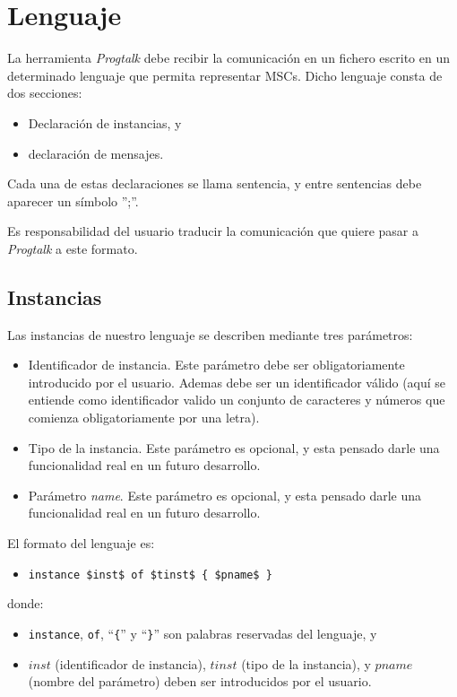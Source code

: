 \documentclass[12pt,a4paper]{report}
\newcommand{\lstsetpt}{
  \lstset{
    language=progtalk,
    style=spec,
  }
}
\begin{document}
\chapter{Lenguaje}
\label{ch:lenguaje}
\lstsetpt

La herramienta \textit{Progtalk} debe recibir la comunicación en un fichero escrito en un determinado lenguaje que permita representar MSCs. Dicho lenguaje consta de dos secciones:
\begin{itemize}
\item Declaración de instancias, y
\item declaración de mensajes.
\end{itemize}

Cada una de estas declaraciones se llama sentencia, y entre sentencias debe aparecer un símbolo '';''.

Es responsabilidad del usuario traducir la comunicación que quiere pasar a \textit{Progtalk} a este formato.

\section{Instancias}

Las instancias de nuestro lenguaje se describen mediante tres parámetros:

\begin{itemize}
\item Identificador de instancia. Este parámetro debe ser obligatoriamente introducido por el usuario. Ademas debe ser un identificador válido (aquí se entiende como identificador valido un conjunto de caracteres y números que comienza obligatoriamente por una letra).
\item Tipo de la instancia. Este parámetro es opcional, y esta pensado darle una funcionalidad real en un futuro desarrollo.
\item Parámetro \textit{name}. Este parámetro es opcional, y esta pensado darle una funcionalidad real en un futuro desarrollo.
\end{itemize}

El formato del lenguaje es:

\begin{itemize}
\item \lstinline[mathescape]!instance $inst$ of $tinst$ { $pname$ }!
\end{itemize}
donde:
\begin{itemize}
\item \lstinline{instance}, \lstinline{of}, ``\lstinline!{!'' y ``\lstinline!}!'' son palabras reservadas del lenguaje, y
\item $inst$ (identificador de instancia), $tinst$ (tipo de la instancia), y $pname$ (nombre del parámetro) deben ser introducidos por el usuario.
\end{itemize}
\end{document}
